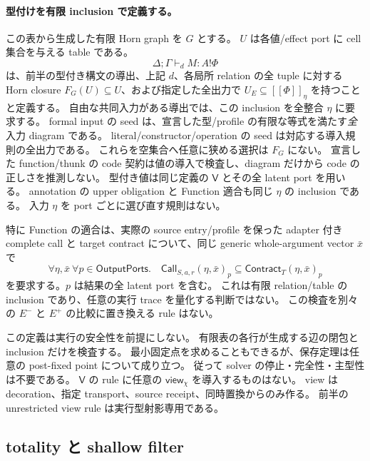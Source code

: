 \documentclass[11pt,a4paper]{article}
\newcommand{\View}{\mathsf{view}}
\newcommand{\llbracket}{[\![}
\newcommand{\rrbracket}{]\!]}
\begin{document}
\paragraph{型付けを有限 inclusion で定義する。}
この表から生成した有限 Horn graph を \(G\) とする。
\(U\) は各値/effect port に cell 集合を与える table である。
\[
 \Delta;\Gamma\vdash_d M:A!\Phi
\]
は、前半の型付き構文の導出、上記 \(d\)、各局所 relation の全 tuple に対する
Horn closure \(F_G(U)\subseteq U\)、および指定した全出力で \(U_E\subseteq\llbracket\Phi\rrbracket_\eta\)
を持つことと定義する。
自由な共同入力がある導出では、この inclusion を全整合 \(\eta\) に要求する。
formal input の seed は、宣言した型/profile の有限な等式を満たす\emph{全}入力 diagram である。
literal/constructor/operation の seed は対応する導入規則の全出力である。
これらを空集合へ任意に狭める選択は \(F_G\) にない。
宣言した function/thunk の code 契約は値の導入で検査し、diagram だけから code の正しさを推測しない。
型付き値は同じ定義の \(\mathsf V\) とその全 latent port を用いる。
annotation の upper obligation と Function 適合も同じ \(\eta\) の inclusion である。
入力 \(\eta\) を port ごとに選び直す規則はない。

特に Function の適合は、実際の source entry/profile を保った adapter 付き complete call と
target contract について、同じ generic whole-argument vector \(\bar x\) で
\[
 \forall\eta,\bar x\ \forall p\in\mathsf{OutputPorts}.\quad
 \mathsf{Call}_{S,a,r}(\eta,\bar x)_p
 \subseteq \mathsf{Contract}_{T}(\eta,\bar x)_p
\]
を要求する。\(p\) は結果の全 latent port を含む。
これは有限 relation/table の inclusion であり、任意の実行 trace を量化する判断ではない。
この検査を別々の \(E^-\) と \(E^+\) の比較に置き換える rule はない。

この定義は実行の安全性を前提にしない。
有限表の各行が生成する辺の閉包と inclusion だけを検査する。
最小固定点を求めることもできるが、保存定理は任意の post-fixed point について成り立つ。
従って solver の停止・完全性・主型性は不要である。
\(\mathsf V\) の rule に任意の \(\View_\chi\) を導入するものはない。
view は decoration、指定 transport、source receipt、同時置換からのみ作る。
前半の unrestricted view rule は実行型射影専用である。

\subsection{totality と shallow filter}
\end{document}
